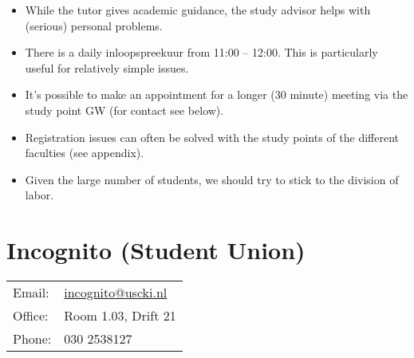 	\begin{itemize}

		\item While the tutor gives academic guidance, the study advisor helps with (serious) personal problems.

		\item There is a daily inloopspreekuur from 11:00 -- 12:00. This is particularly useful for relatively simple issues.

		\item It's possible to make an appointment for a longer (30 minute) meeting via the study point GW (for contact see below).

		\item Registration issues can often be solved with the study points of the different faculties (see appendix).

		\item Given the large number of students, we should try to stick to the division of labor.

	\end{itemize}

\section{Incognito (Student Union)}

\begin{tabular}{l l}
Email: & \href{mailto:incognito@uscki.nl}{incognito@uscki.nl}\\
Office: & Room 1.03, Drift 21\\
Phone: & 030 2538127
\end{tabular}

